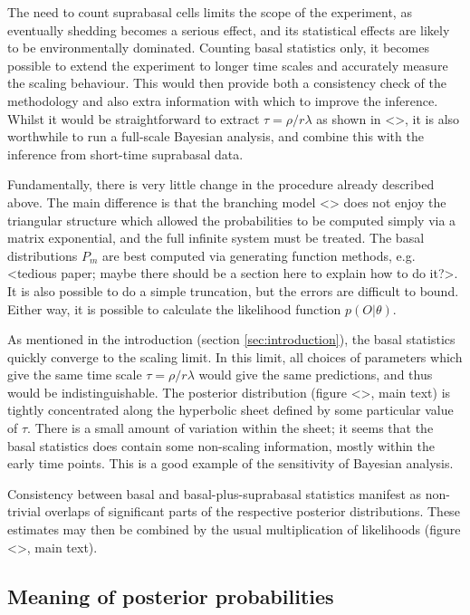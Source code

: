\documentclass[10pt,UKenglish]{article}
\begin{document}
The need to count suprabasal cells limits the scope of the experiment, as eventually shedding becomes a serious effect, and its statistical effects are likely to be environmentally dominated. Counting basal statistics only, it becomes possible to extend the experiment to longer time scales and accurately measure the scaling behaviour. This would then provide both a consistency check of the methodology and also extra information with which to improve the inference. Whilst it would be straightforward to extract $\tau = \rho/r\lambda$ as shown in <>, it is also worthwhile to run a full-scale Bayesian analysis, and combine this with the inference from short-time suprabasal data.

Fundamentally, there is very little change in the procedure already described above. The main difference is that the branching model <> does not enjoy the triangular structure which allowed the probabilities to be computed simply via a matrix exponential, and the full infinite system must be treated. The basal distributions $P_m$ are best computed via generating function methods, e.g. <tedious paper; maybe there should be a section here to explain how to do it?>. It is also possible to do a simple truncation, but the errors are difficult to bound. Either way, it is possible to calculate the likelihood function $p(O|\theta)$.

As mentioned in the introduction (section \ref{sec:introduction}), the basal statistics quickly converge to the scaling limit. In this limit, all choices of parameters which give the same time scale $\tau=\rho/r\lambda$ would give the same predictions, and thus would be indistinguishable. The posterior distribution (figure <>, main text) is tightly concentrated along the hyperbolic sheet defined by some particular value of $\tau$. There is a small amount of variation within the sheet; it seems that the basal statistics does contain some non-scaling information, mostly within the early time points. This is a good example of the sensitivity of Bayesian analysis.

Consistency between basal and basal-plus-suprabasal statistics manifest as non-trivial overlaps of significant parts of the respective posterior distributions. These estimates may then be combined by the usual multiplication of likelihoods (figure <>, main text).

\subsection{Meaning of posterior probabilities}
\end{document}
